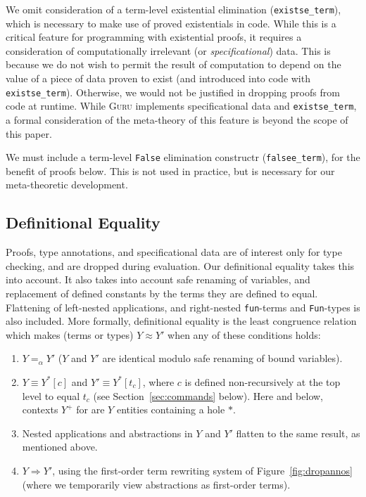 \documentclass{fundam}
\newcommand{\To}{\Rightarrow}
\begin{document}
We omit consideration of a term-level existential elimination
(\texttt{existse\_term}), which is necessary to make use of proved
existentials in code.  While this is a critical feature for
programming with existential proofs, it requires a consideration of
computationally irrelevant (or \emph{specificational}) data.  This is
because we do not wish to permit the result of computation to depend
on the value of a piece of data proven to exist (and introduced into
code with \texttt{existse\_term}).  Otherwise, we would not be
justified in dropping proofs from code at runtime.  While \textsc{Guru}
implements specificational data and \texttt{existse\_term}, a formal
consideration of the meta-theory of this feature is beyond the scope
of this paper.

We must include a term-level \texttt{False} elimination constructr
(\texttt{falsee\_term}), for the benefit of proofs below.  This is not
used in practice, but is necessary for our meta-theoretic development.

\subsection{Definitional Equality}
\label{sec:defeq}

Proofs, type annotations, and specificational data are of interest
only for type checking, and are dropped during evaluation.  Our
definitional equality takes this into account.  It also takes into
account safe renaming of variables, and replacement of defined
constants by the terms they are defined to equal.  Flattening of
left-nested applications, and right-nested \texttt{fun}-terms and
\texttt{Fun}-types is also included.  More formally, definitional
equality is the least congruence relation which makes (terms or types)
$Y \approx Y'$ when any of these conditions holds:
\begin{enumerate}
\item $Y =_\alpha Y'$ ($Y$ and $Y'$ are identical modulo safe renaming
of bound variables).
\item $Y \equiv Y^*[c]$ and $Y' \equiv Y^*[t_c]$, where $c$ is defined
non-recursively at the top level to equal $t_c$ (see
Section~\ref{sec:commands} below).  Here and below, contexts $Y^+$ for
are $Y$ entities containing a hole $*$.
\item Nested applications and abstractions in $Y$ and $Y'$ flatten
to the same result, as mentioned above.
\item $Y \To Y'$, using the first-order term rewriting system of
Figure~\ref{fig:dropannos} (where we temporarily view abstractions
as first-order terms).
\end{enumerate}
\end{document}
